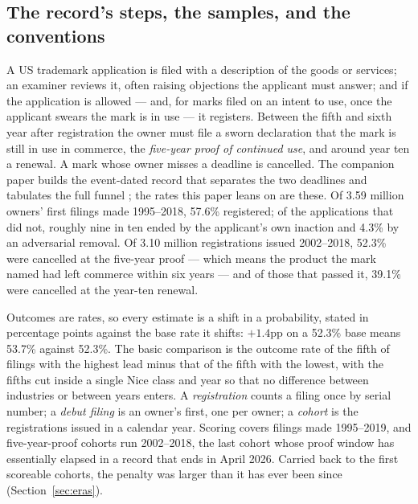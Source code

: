 \subsection{The record's steps, the samples, and the conventions}\label{sec:gates}

A US trademark application is filed with a description of the goods or
services; an examiner reviews it, often raising objections the applicant
must answer; and if the application is allowed --- and, for marks filed
on an intent to use, once the applicant swears the mark is in use --- it
registers. Between the fifth and sixth year after registration the owner
must file a sworn declaration that the mark is still in use in commerce,
the \emph{five-year proof of continued use}, and around year ten a
renewal. A mark whose owner misses a deadline is cancelled. The companion
paper builds the event-dated record that separates the two deadlines and
tabulates the full funnel \citep{SilverCorpus2026}; the rates this paper
leans on are these. Of 3.59 million owners' first filings made
1995--2018, 57.6\% registered; of the applications that did not, roughly
nine in ten ended by the applicant's own inaction and 4.3\% by an
adversarial removal. Of 3.10 million registrations issued 2002--2018,
52.3\% were cancelled at the five-year proof --- which means the product
the mark named had left commerce within six years --- and of those that
passed it, 39.1\% were cancelled at the year-ten renewal.

Outcomes are rates, so every estimate is a shift in a probability, stated
in percentage points against the base rate it shifts: $+1.4$pp on a
52.3\% base means 53.7\% against 52.3\%. The basic comparison is the
outcome rate of the fifth of filings with the highest lead minus that of
the fifth with the lowest, with the fifths cut inside a single Nice class
and year so that no difference between industries or between years
enters. A \emph{registration} counts a filing once by serial number; a
\emph{debut filing} is an owner's first, one per owner; a \emph{cohort}
is the registrations issued in a calendar year. Scoring covers filings
made 1995--2019, and five-year-proof cohorts run 2002--2018, the last
cohort whose proof window has essentially elapsed in a record that ends
in April 2026. Carried back to the first scoreable cohorts, the penalty
was larger than it has ever been since (Section~\ref{sec:eras}).
